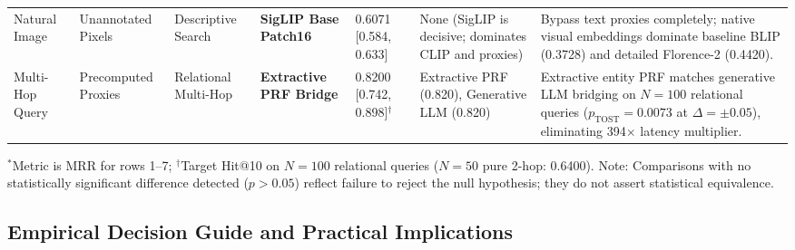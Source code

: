 \begin{table}[t]
\begin{tabular}{@{}p{1.6cm}p{1.8cm}p{1.8cm}p{2.1cm}p{1.8cm}p{2.3cm}p{4.1cm}@{}}
Natural Image & Unannotated Pixels & Descriptive Search & \textbf{SigLIP Base Patch16} & 0.6071 [0.584, 0.633] & None (SigLIP is decisive; dominates CLIP and proxies) & Bypass text proxies completely; native visual embeddings dominate baseline BLIP (0.3728) and detailed Florence-2 (0.4420). \\
Multi-Hop Query & Precomputed Proxies & Relational Multi-Hop & \textbf{Extractive PRF Bridge} & 0.8200 [0.742, 0.898]$^\dagger$ & Extractive PRF (0.820), Generative LLM (0.820) & Extractive entity PRF matches generative LLM bridging on $N=100$ relational queries ($p_{\text{TOST}}=0.0073$ at $\Delta=\pm 0.05$), eliminating 394$\times$ latency multiplier. \\
\bottomrule
\end{tabular}
\vspace{0mm}\newline
\raggedright\scriptsize $^*$Metric is MRR for rows 1--7; $^\dagger$Target Hit@10 on $N=100$ relational queries ($N=50$ pure 2-hop: 0.6400). Note: Comparisons with no statistically significant difference detected ($p > 0.05$) reflect failure to reject the null hypothesis; they do not assert statistical equivalence.
\end{table}

\subsection{Empirical Decision Guide and Practical Implications}
\label{sec:practical_implications}

